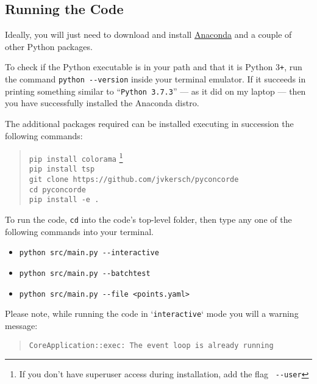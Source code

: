 \begin{appendices}
\renewcommand{\thesection}{\Roman{section}\;\;}
\section{Running the Code}

Ideally, you will just need to download and install \href{https://www.anaconda.com/products/individual}{Anaconda} and a couple of other Python packages.  

To check if the Python executable is in your path and that it is Python 3\texttt{+}, run the command \verb|python --version| 
inside your terminal emulator. If it succeeds in printing something similar to ``\verb|Python 3.7.3|'' --- as it did on my laptop --- then 
you have successfully installed the Anaconda distro. 

The additional packages required can be installed executing in succession the following commands:
\begin{quote}
\color{blue}
\texttt{pip install colorama}  \footnote{If you don't have superuser access during installation, add the flag \texttt{\color{red} \texttt{-{}-}user}}  \\
\texttt{pip install tsp} \\
\texttt{git clone https://github.com/jvkersch/pyconcorde} \\
\texttt{cd pyconcorde}\\
\texttt{pip install -e .}
\end{quote}


To run the code, \texttt{cd} into the code's top-level folder, then type any one of the following commands into your terminal. 

\begin{itemize}
\item \verb|python src/main.py --interactive|
\item \verb|python src/main.py --batchtest|
\item \verb|python src/main.py --file <points.yaml>|
\end{itemize}

Please note, while  running the  code in `\verb|interactive|` mode you will a
warning message:


\begin{quote}

\color{blue}
\verb|CoreApplication::exec: The event loop is already running|
\end{quote}


\end{appendices}
